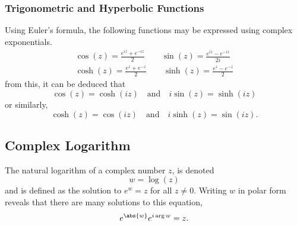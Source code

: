\documentclass{article}
\begin{document}
\subsubsection{Trigonometric and Hyperbolic Functions}
Using Euler's formula, the following functions may be expressed using
complex exponentials.
\begin{align*}
    \cos{\left( z \right)} = \frac{e^{i z} + e^{-i z}}{2} \qquad \sin{\left( z \right)} = \frac{e^{i z} - e^{-i z}}{2i} \\
    \cosh{\left( z \right)} = \frac{e^{z} + e^{-z}}{2} \qquad \sinh{\left( z \right)} = \frac{e^{z} - e^{-z}}{2}
\end{align*}
from this, it can be deduced that
\begin{equation*}
    \cos{\left( z \right)} = \cosh{\left( i z \right)} \quad \text{and} \quad i \sin{\left( z \right)} = \sinh{\left( i z \right)}
\end{equation*}
or similarly,
\begin{equation*}
    \cosh{\left( z \right)} = \cos{\left( i z \right)} \quad \text{and} \quad i \sinh{\left( z \right)} = \sin{\left( i z \right)}.
\end{equation*}
\subsection{Complex Logarithm}
The natural logarithm of a complex number \(z\), is denoted
\begin{equation*}
    w = \log{\left( z \right)}
\end{equation*}
and is defined as the solution to \(e^w = z\) for all \(z \neq 0\).
Writing \(w\) in polar form reveals that there are many solutions to
this equation,
\begin{equation*}
    e^{\abs{w}} e^{i \arg{w}} = z.
\end{equation*}
\end{document}
